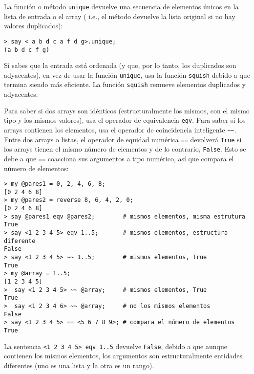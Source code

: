 La función o método {\tt unique} devuelve una secuencia
de elementos únicos en la lista de entrada o el array (
i.e., el método devuelve la lista original si no hay valores
duplicados):

\begin{verbatim}
> say < a b d c a f d g>.unique;
(a b d c f g)
\end{verbatim}

Si sabes que la entrada está ordenada (y que, por lo tanto,
los duplicados son adyacentes), en vez de usar la función
{\tt unique}, usa la función {\tt squish} debido a que termina
siendo más eficiente. La función {\tt squish} remueve elementos
duplicados y adyacentes.

Para saber si dos arrays son idénticos (estructuralmente 
los mismos, con el mismo tipo y los mismos valores), usa 
el operador de equivalencia {\tt eqv}. Para saber si los arrays
contienen los elementos, usa el operador de coincidencia inteligente
\verb|~~|. Entre dos arrays o listas, el operador de equidad numérica
\verb|==| devolverá {\tt True} si los arrays tienen el mismo número 
de elementos y de lo contrario, {\tt False}. Esto se debe a que
\verb|==| coacciona sus argumentos a tipo numérico, así que compara
el número de elementos:

\begin{verbatim}
> my @pares1 = 0, 2, 4, 6, 8;
[0 2 4 6 8]
> my @pares2 = reverse 8, 6, 4, 2, 0;
[0 2 4 6 8]
> say @pares1 eqv @pares2;        # mismos elementos, misma estrutura
True
> say <1 2 3 4 5> eqv 1..5;       # mismos elementos, estructura diferente
False
> say <1 2 3 4 5> ~~ 1..5;        # mismos elementos, True
True
> my @array = 1..5;               
[1 2 3 4 5]
>  say <1 2 3 4 5> ~~ @array;     # mismos elementos, True
True
>  say <1 2 3 4 6> ~~ @array;     # no los mismos elementos
False
> say <1 2 3 4 5> == <5 6 7 8 9>; # compara el número de elementos
True
\end{verbatim}

La sentencia \verb'<1 2 3 4 5> eqv 1..5' devuelve \verb|False|, debido 
a que aunque contienen los mismos elementos, los argumentos 
son estructuralmente entidades diferentes (uno es una lista y 
la otra es un rango).

